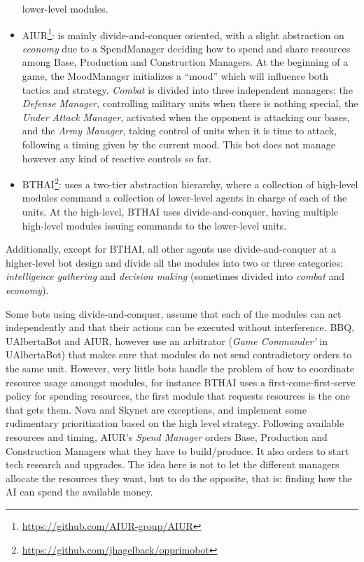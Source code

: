 \documentclass{llncs}
\begin{document}
\begin{itemize}
  lower-level modules.
\item  AIUR\footnote{\url{https://github.com/AIUR-group/AIUR}}:  is
  mainly divide-and-conquer oriented,
  with a  slight abstraction on  {\em economy} due to a  SpendManager deciding
  how  to  spend  and  share  resources  among  Base,  Production  and
  Construction Managers.  At the beginning of a  game, the MoodManager
  initializes  a  ``mood''  which  will  influence  both  tactics  and
  strategy. {\em Combat} is divided into three  independent managers: the
  {\em  Defense Manager},  controlling  military units  when there  is
  nothing special, the {\em  Under Attack Manager}, activated when the
  opponent is attacking our bases,  and the {\em Army Manager}, taking
  control of units when it is time to attack, following a timing given
  by the  current mood. This bot  does not manage however  any kind of
  reactive controls so far.
\item  BTHAI\footnote{\url{https://github.com/jhagelback/opprimobot}}:  uses  a
  two-tier  abstraction hierarchy,  where a  collection  of high-level
  modules command a collection of lower-level agents in charge of each
  of  the units.  At  the high-level,  BTHAI uses  divide-and-conquer,
  having   multiple  high-level  modules   issuing  commands   to  the
  lower-level units.
\end{itemize}

Additionally, except for BTHAI, all other agents use divide-and-conquer at a higher-level bot design and divide all the modules into two or three categories: {\em intelligence gathering} and {\em decision making} (sometimes divided into {\em combat} and {\em economy}).

Some bots  using divide-and-conquer, assume  that each of  the modules
can act independently  and that their actions can  be executed without
interference.  BBQ,  UAlbertaBot and  AIUR, however use  an arbitrator
({\em Game Commander'} in UAlbertaBot) that makes sure that modules do
not send contradictory orders to  the same unit.  However, very little
bots handle  the problem of  how to coordinate resource  usage amongst
modules, for  instance BTHAI uses a  first-come-first-serve policy for
spending resources,  the first module  that requests resources  is the
one that gets them. Nova and Skynet are exceptions, and implement some
rudimentary prioritization based on the high level strategy. Following
available  resources and  timing,  AIUR's {\em  Spend Manager}  orders
Base,  Production   and  Construction  Managers  what   they  have  to
build/produce. It also orders to start tech research and upgrades. The
idea here is not to let the different managers allocate the resources they want, but to do the opposite, that is: finding how the AI can
spend the available money.
\end{document}
